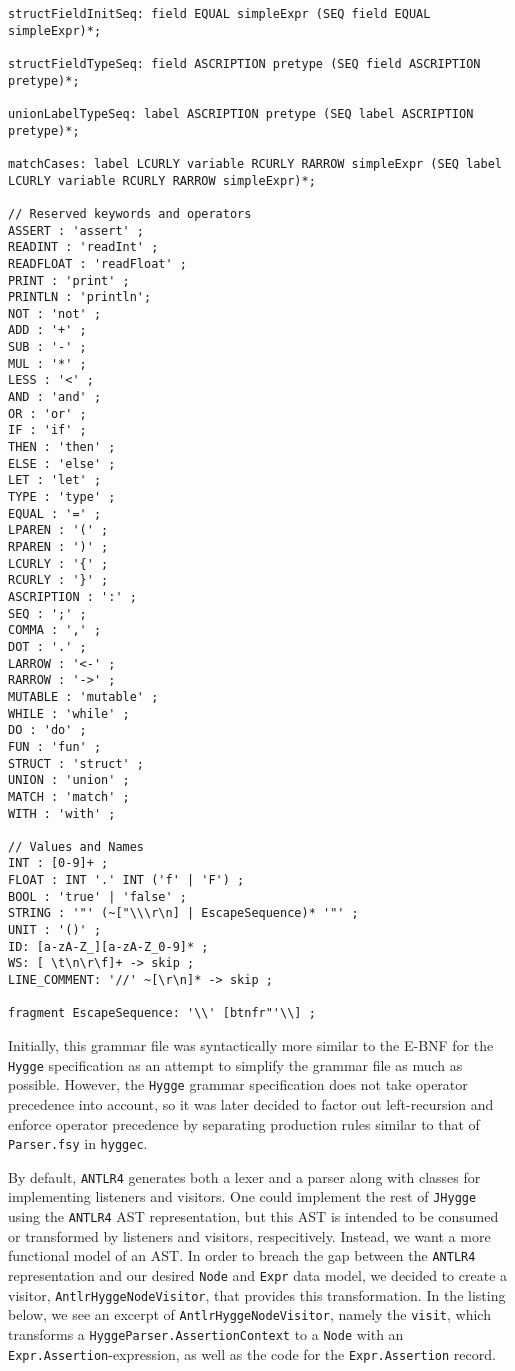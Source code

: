 \begin{lstlisting}
structFieldInitSeq: field EQUAL simpleExpr (SEQ field EQUAL simpleExpr)*;

structFieldTypeSeq: field ASCRIPTION pretype (SEQ field ASCRIPTION pretype)*;

unionLabelTypeSeq: label ASCRIPTION pretype (SEQ label ASCRIPTION pretype)*;

matchCases: label LCURLY variable RCURLY RARROW simpleExpr (SEQ label LCURLY variable RCURLY RARROW simpleExpr)*;

// Reserved keywords and operators
ASSERT : 'assert' ;
READINT : 'readInt' ;
READFLOAT : 'readFloat' ;
PRINT : 'print' ;
PRINTLN : 'println';
NOT : 'not' ;
ADD : '+' ;
SUB : '-' ;
MUL : '*' ;
LESS : '<' ;
AND : 'and' ;
OR : 'or' ;
IF : 'if' ;
THEN : 'then' ;
ELSE : 'else' ;
LET : 'let' ;
TYPE : 'type' ;
EQUAL : '=' ;
LPAREN : '(' ;
RPAREN : ')' ;
LCURLY : '{' ;
RCURLY : '}' ;
ASCRIPTION : ':' ;
SEQ : ';' ;
COMMA : ',' ;
DOT : '.' ;
LARROW : '<-' ;
RARROW : '->' ;
MUTABLE : 'mutable' ;
WHILE : 'while' ;
DO : 'do' ;
FUN : 'fun' ;
STRUCT : 'struct' ;
UNION : 'union' ;
MATCH : 'match' ;
WITH : 'with' ;

// Values and Names
INT : [0-9]+ ;
FLOAT : INT '.' INT ('f' | 'F') ;
BOOL : 'true' | 'false' ;
STRING : '"' (~["\\\r\n] | EscapeSequence)* '"' ;
UNIT : '()' ;
ID: [a-zA-Z_][a-zA-Z_0-9]* ;
WS: [ \t\n\r\f]+ -> skip ;
LINE_COMMENT: '//' ~[\r\n]* -> skip ;

fragment EscapeSequence: '\\' [btnfr"'\\] ; 
\end{lstlisting}

Initially, this grammar file was syntactically more similar to the E-BNF for the \texttt{Hygge} specification as an attempt to
simplify the grammar file as much as possible. However, the \texttt{Hygge} grammar specification does not take operator
precedence into account, so it was later decided to factor out left-recursion and enforce operator precedence by separating
production rules similar to that of \texttt{Parser.fsy} in \texttt{hyggec}.

By default, \texttt{ANTLR4} generates both a lexer and a parser along with classes for implementing listeners and visitors.
One could implement the rest of \texttt{JHygge} using the \texttt{ANTLR4} AST representation, but this AST is intended to
be consumed or transformed by listeners and visitors, respecitively. Instead, we want a more functional model of an AST.
In order to breach the gap between the \texttt{ANTLR4} representation and our desired \texttt{Node} and \texttt{Expr} data model,
we decided to create a visitor, \texttt{AntlrHyggeNodeVisitor}, that provides this transformation. In the listing below, we
see an excerpt of \texttt{AntlrHyggeNodeVisitor}, namely the \texttt{visit}, which transforms a \texttt{HyggeParser.AssertionContext}
to a \texttt{Node} with an \texttt{Expr.Assertion}-expression, as well as the code for the \texttt{Expr.Assertion} record.


